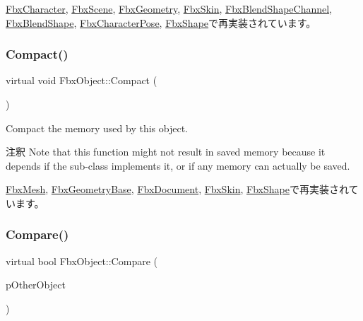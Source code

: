 \hyperlink{class_fbx_character_a6aba29e5583b547aae493d3b79a74ac2}{Fbx\+Character}, \hyperlink{class_fbx_scene_acee728f921bf4e25f6f8accf3446b079}{Fbx\+Scene}, \hyperlink{class_fbx_geometry_aab95116993bd539bb870897d005d44de}{Fbx\+Geometry}, \hyperlink{class_fbx_skin_ad6699903d1b3ef2ea14769a6e75caeed}{Fbx\+Skin}, \hyperlink{class_fbx_blend_shape_channel_a37993d2cccb4376edb241577ccbd061f}{Fbx\+Blend\+Shape\+Channel}, \hyperlink{class_fbx_blend_shape_aea5560eb695574977b5e7b8d0387d81a}{Fbx\+Blend\+Shape}, \hyperlink{class_fbx_character_pose_af191f8d48c8f11e795adcb92adae35c5}{Fbx\+Character\+Pose}, \hyperlink{class_fbx_shape_aca0dfb34dc9b38d5fdbf0d004fc60697}{Fbx\+Shape}で再実装されています。

\mbox{\label{class_fbx_object_a2720f16a08150d162242b0c59f58c3dc}} 
\subsubsection{\texorpdfstring{Compact()}{Compact()}}
{\footnotesize\ttfamily virtual void Fbx\+Object\+::\+Compact (\begin{DoxyParamCaption}{ }\end{DoxyParamCaption})\hspace{0.3cm}{\ttfamily [virtual]}}

Compact the memory used by this object. \begin{DoxyRemark}{注釈}
Note that this function might not result in saved memory because it depends if the sub-\/class implements it, or if any memory can actually be saved. 
\end{DoxyRemark}


\hyperlink{class_fbx_mesh_a05ca6a8fbd028777c91931ce6edf4b19}{Fbx\+Mesh}, \hyperlink{class_fbx_geometry_base_a66146155ecad4e6f6f2e8cf52e0340f6}{Fbx\+Geometry\+Base}, \hyperlink{class_fbx_document_a62a41699423c0431a1e0969e9dea176d}{Fbx\+Document}, \hyperlink{class_fbx_skin_a3c794b4a2f5e83725ea2f3b2b7b2d45c}{Fbx\+Skin}, \hyperlink{class_fbx_shape_a9c3c948d3646bf78472164860ad11d65}{Fbx\+Shape}で再実装されています。

\mbox{\label{class_fbx_object_a49a593ea33e629adfac89c3238838144}} 
\subsubsection{\texorpdfstring{Compare()}{Compare()}}
{\footnotesize\ttfamily virtual bool Fbx\+Object\+::\+Compare (\begin{DoxyParamCaption}\item[{\hyperlink{class_fbx_object}{Fbx\+Object} $\ast$}]{p\+Other\+Object }\end{DoxyParamCaption})\hspace{0.3cm}{\ttfamily [virtual]}}

